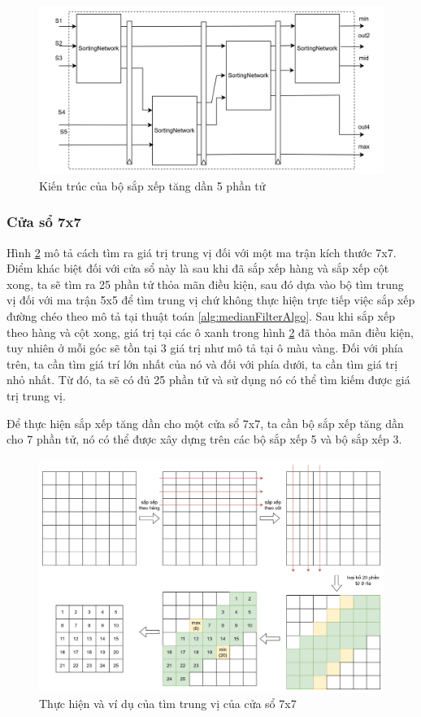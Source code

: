 \begin{figure}[!ht]
	\centering
	\includegraphics[width=\linewidth]{figures/sortAscending5x5RTL.png}
	\caption{Kiến trúc của bộ sắp xếp tăng dần 5 phần tử}
	\label{fig:sortAscending5x5RTL}
\end{figure}

\subsubsection{Cửa sổ 7x7}

Hình \ref{fig:median7x7Example} mô tả cách tìm ra giá trị trung vị đối với một ma trận kích thước 7x7. Điểm khác biệt đối với cửa sổ này là sau khi đã sắp xếp hàng và sắp xếp cột xong, ta sẽ tìm ra 25 phần tử thỏa mãn điều kiện, sau đó dựa vào bộ tìm trung vị đối với ma trận 5x5 để tìm trung vị chứ không thực hiện trực tiếp việc sắp xếp đường chéo theo mô tả tại thuật toán \ref{alg:medianFilterAlgo}. Sau khi sắp xếp theo hàng và cột xong, giá trị tại các ô xanh trong hình \ref{fig:median7x7Example} đã thỏa mãn điều kiện, tuy nhiên ở mỗi góc sẽ tồn tại 3 giá trị như mô tả tại ô màu vàng. Đối với phía trên, ta cần tìm giá trí lớn nhất của nó và đối với phía dưới, ta cần tìm giá trị nhỏ nhất. Từ đó, ta sẽ có đủ 25 phần tử và sử dụng nó có thể tìm kiếm được giá trị trung vị.

Để thực hiện sắp xếp tăng dần cho một cửa sổ 7x7, ta cần bộ sắp xếp tăng dần cho 7 phần tử, nó có thể được xây dựng trên các bộ sắp xếp 5 và bộ sắp xếp 3.
\begin{figure}[!ht]
	\centering
	\includegraphics[width=\linewidth]{figures/median7x7Example.png}
	\caption{Thực hiện và ví dụ của tìm trung vị của cửa sổ 7x7}
	\label{fig:median7x7Example}
\end{figure}


